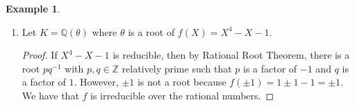 \documentclass[a4paper]{book}
\theoremstyle{definition}
\newtheorem{example}{Example}[definition]
\begin{document}
\begin{example}
\begin{enumerate}
\begin{proof}
            Let \(\alpha = a + \theta b + \theta^2 c\) be an element in \(K\) and define a linear operator \(\Phi_\alpha\) by
            \begin{align*}
                1 + 0 \cdot \theta + 0 \cdot \theta^2 \mapsto \alpha &= a + \theta b + \theta^2 c \\
                0 + 1 \cdot \theta + 0 \cdot \theta^2 \mapsto \theta \alpha &= \theta^3c + \theta a + \theta^2 b \\
                &= (\theta + 1)c + \theta a + \theta^2 b \\
                &= c + \theta (a + c) + \theta^2 b \\
                0 + 0 \cdot \theta + 1 \cdot \theta^2 \mapsto \theta^2\alpha &= \theta^3 b + \theta^4 c + \theta^2 a \\
                &= (\theta + 1)b + (\theta^2 + \theta)c + \theta^2 a\\
                &= b + \theta b + \theta^2 c + \theta c + \theta^2 a \\
                &= b + \theta (b + c) + \theta^2 (a + c) 
            \end{align*}
            which we represent with a \(3 \times 3\) matrix
            \begin{align*}
                A_\Phi = \begin{pmatrix}
                    a & c & b \\
                    b & a + c & b + c \\
                    c & b & a + c
                \end{pmatrix}
            \end{align*}
            so we have \(\mathrm{Tr}_K(\alpha) = 3a + 2c\) and \(\mathrm{N}_K(\alpha) = a^3 + b^3 + 2 a^2 c - b c^2 + c^3 + a (-b^2 - 3 b c + c^2)\).
        \end{proof}
        \item Let \(K = \mathbb{Q}(\theta)\) where \(\theta\) is a root of \(f(X) = X^4 - X - 1\).
        \begin{proof}
            If \(X^4 - X - 1\) is reducible, then by Rational Root Theorem, there is a root \(pq^{-1}\) with \(p, q \in \mathbb{Z}\) relatively prime such that \(p\) is a factor of \(-1\) and \(q\) is a factor of \(1\). However, \(\pm 1\) is not a root because \(f(\pm 1) = 1 \pm 1 - 1 = \pm 1\). We have that \(f\) is irreducible over the rational numbers.


\end{proof}
\end{enumerate}
\end{example}
\end{document}
